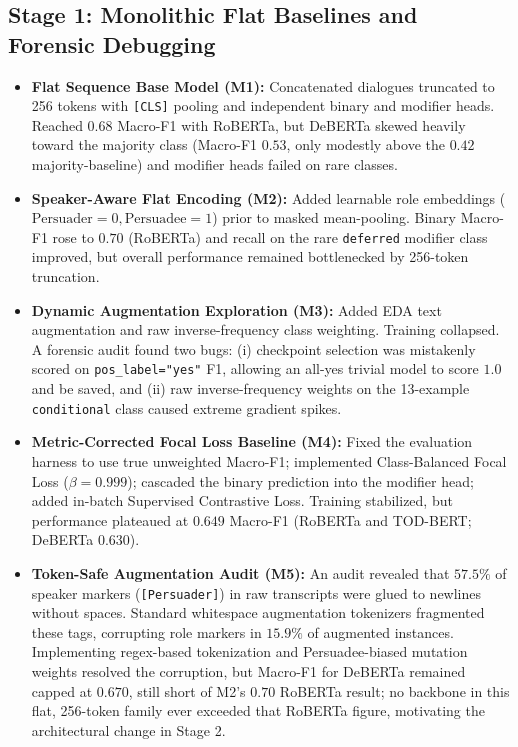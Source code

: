 \subsection{Stage 1: Monolithic Flat Baselines and Forensic Debugging}
\begin{itemize}
  \item \textbf{Flat Sequence Base Model (M1):} Concatenated dialogues truncated to 256 tokens with \texttt{[CLS]} pooling and independent binary and modifier heads. Reached $0.68$ Macro-F1 with RoBERTa, but DeBERTa skewed heavily toward the majority class (Macro-F1 $0.53$, only modestly above the $0.42$ majority-baseline) and modifier heads failed on rare classes.
  \item \textbf{Speaker-Aware Flat Encoding (M2):} Added learnable role embeddings ($\text{Persuader}=0, \text{Persuadee}=1$) prior to masked mean-pooling. Binary Macro-F1 rose to $0.70$ (RoBERTa) and recall on the rare \texttt{deferred} modifier class improved, but overall performance remained bottlenecked by 256-token truncation.
  \item \textbf{Dynamic Augmentation Exploration (M3):} Added EDA text augmentation \cite{wei2019eda} and raw inverse-frequency class weighting. Training collapsed. A forensic audit found two bugs: (i) checkpoint selection was mistakenly scored on \texttt{pos\_label="yes"} F1, allowing an all-yes trivial model to score $1.0$ and be saved, and (ii) raw inverse-frequency weights on the 13-example \texttt{conditional} class caused extreme gradient spikes.
  \item \textbf{Metric-Corrected Focal Loss Baseline (M4):} Fixed the evaluation harness to use true unweighted Macro-F1; implemented Class-Balanced Focal Loss ($\beta=0.999$); cascaded the binary prediction into the modifier head; added in-batch Supervised Contrastive Loss. Training stabilized, but performance plateaued at $0.649$ Macro-F1 (RoBERTa and TOD-BERT; DeBERTa $0.630$).
  \item \textbf{Token-Safe Augmentation Audit (M5):} An audit revealed that $57.5\%$ of speaker markers (\texttt{[Persuader]}) in raw transcripts were glued to newlines without spaces. Standard whitespace augmentation tokenizers fragmented these tags, corrupting role markers in $15.9\%$ of augmented instances. Implementing regex-based tokenization and Persuadee-biased mutation weights resolved the corruption, but Macro-F1 for DeBERTa remained capped at $0.670$, still short of M2's $0.70$ RoBERTa result; no backbone in this flat, 256-token family ever exceeded that RoBERTa figure, motivating the architectural change in Stage 2.
\end{itemize}

